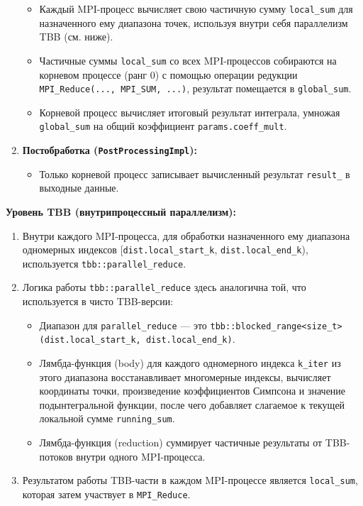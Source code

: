 \documentclass[a4paper,12pt]{article}
\begin{document}
\begin{enumerate}
\begin{itemize}
            \item Каждый MPI-процесс вычисляет свою частичную сумму \texttt{local\_sum} для назначенного ему диапазона точек, используя внутри себя параллелизм TBB (см. ниже).
            \item Частичные суммы \texttt{local\_sum} со всех MPI-процессов собираются на корневом процессе (ранг 0) с помощью операции редукции \texttt{MPI\_Reduce(..., MPI\_SUM, ...)}, результат помещается в \texttt{global\_sum}.
            \item Корневой процесс вычисляет итоговый результат интеграла, умножая \texttt{global\_sum} на общий коэффициент \texttt{params.coeff\_mult}.
        \end{itemize}
    \item \textbf{Постобработка (\texttt{PostProcessingImpl}):}
        \begin{itemize}
            \item Только корневой процесс записывает вычисленный результат \texttt{result\_} в выходные данные.
        \end{itemize}
\end{enumerate}

\textbf{Уровень TBB (внутрипроцессный параллелизм):}
\begin{enumerate}
    \item Внутри каждого MPI-процесса, для обработки назначенного ему диапазона одномерных индексов [\texttt{dist.local\_start\_k}, \texttt{dist.local\_end\_k}), используется \texttt{tbb::parallel\_reduce}.
    \item Логика работы \texttt{tbb::parallel\_reduce} здесь аналогична той, что используется в чисто TBB-версии:
        \begin{itemize}
            \item Диапазон для \texttt{parallel\_reduce} — это \texttt{tbb::blocked\_range<size\_t>(dist.local\_start\_k, dist.local\_end\_k)}.
            \item Лямбда-функция (body) для каждого одномерного индекса \texttt{k\_iter} из этого диапазона восстанавливает многомерные индексы, вычисляет координаты точки, произведение коэффициентов Симпсона и значение подынтегральной функции, после чего добавляет слагаемое к текущей локальной сумме \texttt{running\_sum}.
            \item Лямбда-функция (reduction) суммирует частичные результаты от TBB-потоков внутри одного MPI-процесса.
        \end{itemize}
    \item Результатом работы TBB-части в каждом MPI-процессе является \texttt{local\_sum}, которая затем участвует в \texttt{MPI\_Reduce}.
\end{enumerate}
\end{document}
